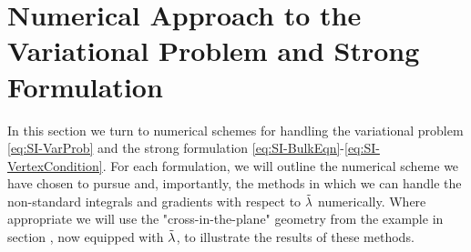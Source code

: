 \section{Numerical Approach to the Variational Problem and Strong Formulation} \label{sec:SI-VPandFDM}

In this section we turn to numerical schemes for handling the variational problem \eqref{eq:SI-VarProb} and the strong formulation \eqref{eq:SI-BulkEqn}-\eqref{eq:SI-VertexCondition}.
For each formulation, we will outline the numerical scheme we have chosen to pursue and, importantly, the methods in which we can handle the non-standard integrals and gradients with respect to $\tilde{\lambda}$ numerically.
Where appropriate we will use the "cross-in-the-plane" geometry from the example in section , now equipped with $\tilde{\lambda}$, to illustrate the results of these methods.

